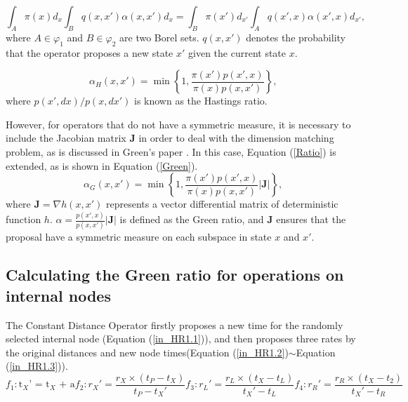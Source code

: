 \documentclass{bmcart}
\begin{document}
\begin{backmatter}
\begin{equation}\label{balance}
\int_A {\pi (x) d_x} {\int_B  {q(x, x')}{\alpha(x, x')} d_x}  = \int_B {\pi (x') d_{x'}}{\int_A {q(x', x)}{\alpha(x', x)} d_{x'}} \text{,}
\end{equation}
where $A \in {\varphi_1}$ and $B \in  {\varphi_2}$ are two Borel sets. ${q(x, x')}$ denotes the probability that the operator proposes a new state $x'$ given the current state $x$.

\begin{equation}\label{Ratio}
{\alpha_H}(x, x') = \min \left\{ {1,\frac{{\pi (x'){p}(x',x)}}{{\pi (x){p}(x,x')}}} \right\} \text{,}
\end{equation}
where ${p(x',dx)}/{p(x,dx')}$ is known as the Hastings ratio.

However, for operators that do not have a symmetric measure, it is necessary to include the Jacobian matrix ${\mathbf{J}}$  in order to deal with the dimension matching problem, as is discussed in Green's paper \cite{green1995reversible}. In this case, Equation (\ref{Ratio}) is extended, as is shown in Equation (\ref{Green}).
\begin{equation}\label{Green}
{\alpha_G}(x, x') = \min \left\{ {1,\frac{{\pi (x'){p}(x',x)}}{{\pi (x){p}(x,x')}}}\left|{\mathbf{J}}\right| \right\} \text{,}
\end{equation}
where ${\mathbf{J}} = {\nabla h(x, x')}$ represents a vector differential matrix of deterministic function $h$. $\alpha = \frac{{p}(x',x)}{{p}(x,x')}\left|{\mathbf{J}}\right|$ is defined as the Green ratio, and ${\mathbf{J}}$ ensures that the proposal have a symmetric measure on each subspace in state $x$ and $x'$.

\subsection*{Calculating the Green ratio for operations on internal nodes}
The Constant Distance Operator firstly proposes a new time for the randomly selected internal node (Equation (\ref{in_HR1.1})), and then proposes three rates by the original distances and new node times(Equation (\ref{in_HR1.2})$\sim$Equation (\ref{in_HR1.3})).
\begin{subequations}\label{in_HR1}
\begin{equation}\label{in_HR1.1}
{f_1}:{{\text{t}}_X}{\text{'  =  }}{{\text{t}}_X}{\text{  +  a}}
\end{equation}
\begin{equation}\label{in_HR1.2}
{f_2}:{r_X}' = \frac{{{r_X} \times ({t_P} - {t_X})}}{{{t_P} - {t_X}'}}
\end{equation}
\begin{equation}
{f_3}:{r_L}' = \frac{{{r_L} \times ({t_X} - {t_L})}}{{{t_X}' - {t_L}}}
\end{equation}
\begin{equation}\label{in_HR1.3}
{f_4}:{r_R}' = \frac{{{r_R} \times ({t_X} - {t_2})}}{{{t_X}' - {t_R}}}
\end{equation}
\end{subequations}


\end{backmatter}
\end{document}
